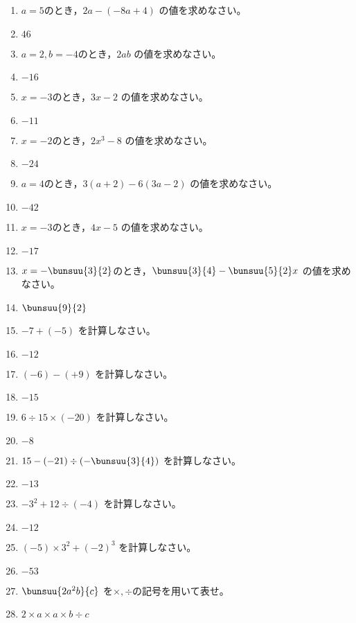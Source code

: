 \documentclass[uplatex,a4j,11pt]{jsreport}
\begin{document}
\begin{multicols}{2}
\begin{enumerate}
    \item $a=5$のとき，$2a-(-8a+4)$ の値を求めなさい。%
    \item $46$
    \item $a=2, b=-4$のとき，$2ab$ の値を求めなさい。%
    \item $-16$
    \item $x=-3$のとき，$3x-2$ の値を求めなさい。%
    \item $-11$
    \item $x=-2$のとき，$2x^3-8$ の値を求めなさい。%
    \item $-24$
    \item $a=4$のとき，$3(a+2)-6(3a-2)$ の値を求めなさい。%
    \item $-42$
    \item $x=-3$のとき，$4x-5$ の値を求めなさい。%
    \item $-17$
    \item $x=-\bunsuu{3}{2}$のとき，$\bunsuu{3}{4}-\bunsuu{5}{2}x$ の値を求めなさい。%
    \item $\bunsuu{9}{2}$
    \item $-7+(-5)$ を計算しなさい。%
    \item $-12$
    \item $(-6)-(+9)$ を計算しなさい。%
    \item $-15$
    \item $6\div15\times (-20)$ を計算しなさい。%
    \item $-8$
    \item $15-(-21)\div \left(-\bunsuu{3}{4}\right)$ を計算しなさい。%
    \item $-13$
    \item $-3^2+12\div (-4)$ を計算しなさい。%
    \item $-12$
    \item $(-5)\times3^2+(-2)^3$ を計算しなさい。%
    \item $-53$
    \item $\bunsuu{2a^2b}{c}$ を$\times,\div$の記号を用いて表せ。%
    \item $2\times a \times a \times b \div c$

\end{enumerate}
\end{multicols}
\end{document}
